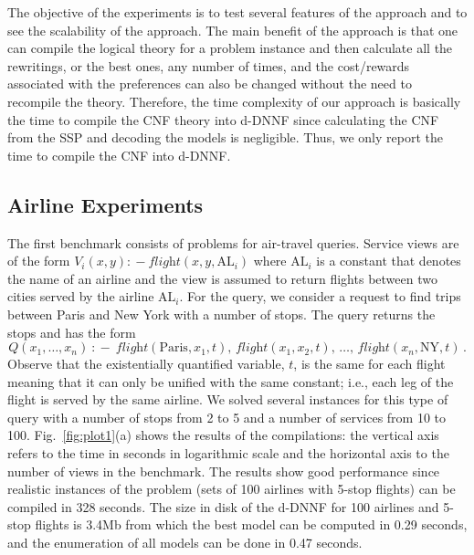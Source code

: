 \documentclass{llncs}
\newcommand{\qrule}{:\!\!-}
\newcommand{\flight}{\textit{flight}}
\newcommand{\PA}{\text{Paris}}
\newcommand{\NY}{\text{NY}}
\newcommand{\AL}{\text{AL}}
\begin{document}
The objective of the experiments is to test several features of the 
approach and to see the scalability of the approach.
The main benefit of the approach is
that one can compile the logical theory for a problem instance and then
calculate all the rewritings, or the best ones, any number of times,
and the cost/rewards associated with the preferences can also be changed
without the need to recompile the theory.
Therefore, the time complexity of our approach is basically the time to
compile the CNF theory into d-DNNF since calculating the CNF from the SSP
and decoding the models is negligible.
Thus, we only report the time to compile the CNF into d-DNNF.

\subsection{Airline Experiments}

The first benchmark consists of problems for air-travel queries.
Service views are of the form $V_i(x,y)\qrule \flight(x,y,\AL_i)$
where $\AL_i$ is a constant that denotes the name of an airline
and the view is assumed to return flights between two cities served
by the airline $\AL_i$. For the query, we consider a request to
find trips between Paris and New York with a number of stops.
The query returns the stops and has the form
\[ Q(x_1,\ldots,x_n)\ \qrule\ \flight(\PA,x_1,t),\,\flight(x_1,x_2,t),\,\ldots,\,\flight(x_n,\NY,t)\,. \]
Observe that the existentially quantified variable, $t$, is the same
for each flight meaning that it can only be unified with the same
constant; i.e., each leg of the flight is served by the same airline.
We solved several instances for this type of query with a number of stops
from 2 to 5 and a number of services from 10 to 100.
Fig.~\ref{fig:plot1}(a) shows the results of the compilations:
the vertical axis refers to the time in seconds in logarithmic
scale and the horizontal axis to the number of views in the benchmark.
The results show good performance since realistic instances of the
problem (sets of 100 airlines with 5-stop flights) can be compiled
in 328 seconds. The size in disk of the d-DNNF for 100 airlines and
5-stop flights is 3.4Mb from which the best model can be computed
in 0.29 seconds, and the enumeration of all models can be done
in 0.47 seconds.
\end{document}
